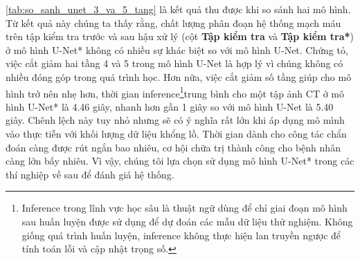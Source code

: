 	\autoref{tab:so_sanh_unet_3_va_5_tang} là kết quả thu được khi so sánh hai mô hình. Từ kết quả này chúng ta thấy rằng, chất lượng phân đoạn hệ thống mạch máu trên tập kiểm tra trước và sau hậu xử lý (cột \textbf{Tập kiểm tra} và \textbf{Tập kiểm tra*}) ở mô hình U-Net* không có nhiều sự khác biệt so với mô hình U-Net. Chứng tỏ, việc cắt giảm hai tầng 4 và 5 trong mô hình U-Net là hợp lý vì chúng không có nhiều đóng góp trong quá trình học. Hơn nữa, việc cắt giảm số tầng giúp cho mô hình trở nên nhẹ hơn, thời gian inference\footnote{Inference trong lĩnh vực học sâu là thuật ngữ dùng để chỉ giai đoạn mô hình sau huấn luyện được sử dụng để dự đoán các mẫu dữ liệu thử nghiệm. Không giống quá trình huấn luyện, inference không thực hiện lan truyền ngược để tính toán lỗi và cập nhật trọng số.}trung bình cho một tập ảnh CT ở mô hình U-Net* là 4.46 giây, nhanh hơn gần 1 giây so với mô hình U-Net là 5.40 giây. Chênh lệch này tuy nhỏ nhưng sẽ có ý nghĩa rất lớn khi áp dụng mô mình vào thực tiễn với khối lượng dữ liệu khổng lồ. Thời gian dành cho công tác chẩn đoán càng được rút ngắn bao nhiêu, cơ hội chữa trị thành công cho bệnh nhân càng lớn bấy nhiêu. Vì vậy, chúng tôi lựa chọn sử dụng mô hình U-Net* trong các thí nghiệp về sau để đánh giá hệ thống.
	\begin{table}[h!]
		\caption{Kết quả so sánh tính hiệu quả trước và sau điều chỉnh số tầng ở mô hình U-Net sử dụng convolution 3D.}
		\label{tab:so_sanh_unet_3_va_5_tang}
	\end{table}

